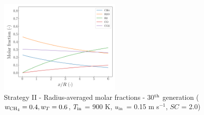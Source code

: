 \documentclass[preprint,12pt]{elsarticle}
\begin{document}
\begin{figure}[h!]
\centering
\includegraphics[width=60mm]{results/5Eq/40C_60T/GEN30-AVG.png}
\caption{\label{fig:5RES4060G30-avg} Strategy II - Radius-averaged molar fractions -  30$^{\rm{th}}$ generation ($w_{\rm{CH_4}} = 0.4, w_T = 0.6$, $T_{\rm{in}}$ = 900 K, $u_{\rm{in}}$ = 0.15 m s$^{-1}$, $SC$ = 2.0)}
\end{figure}
\end{document}
